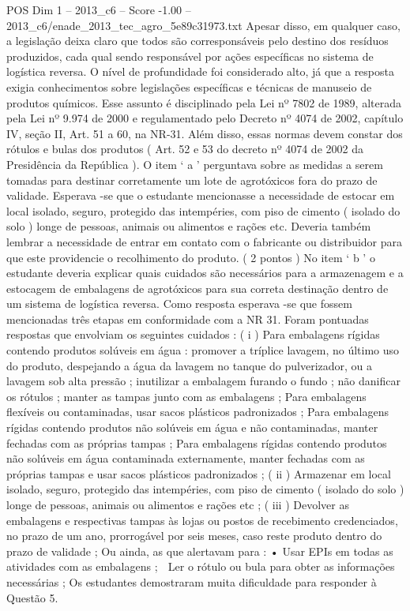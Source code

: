 \begin{textsample}{POS Dim 1 – 2013\_c6 – Score -1.00 – 2013\_c6/enade\_2013\_tec\_agro\_5e89c31973.txt}
Apesar disso, em qualquer caso, a legislação deixa claro que todos são corresponsáveis pelo destino dos resíduos produzidos, cada qual sendo responsável por ações específicas no sistema de logística reversa.
O nível de profundidade foi considerado alto, já que a resposta exigia conhecimentos sobre legislações específicas e técnicas de manuseio de produtos químicos.
Esse assunto é disciplinado pela Lei nº 7802 de 1989, alterada pela Lei nº 9.974 de 2000 e regulamentado pelo Decreto nº 4074 de 2002, capítulo IV, seção II, Art. 51 a 60, na NR-31.
Além disso, essas normas devem constar dos rótulos e bulas dos produtos ( Art. 52 e 53 do decreto nº 4074 de 2002 da Presidência da República ).
O item ‘ a ’ perguntava sobre as medidas a serem tomadas para destinar corretamente um lote de agrotóxicos fora do prazo de validade.
Esperava -se que o estudante mencionasse a necessidade de estocar em local isolado, seguro, protegido das intempéries, com piso de cimento ( isolado do solo ) longe de pessoas, animais ou alimentos e rações etc.
Deveria também lembrar a necessidade de entrar em contato com o fabricante ou distribuidor para que este providencie o recolhimento do produto. ( 2 pontos ) No item ‘ b ’ o estudante deveria explicar quais cuidados são necessários para a armazenagem e a estocagem de embalagens de agrotóxicos para sua correta destinação dentro de um sistema de logística reversa.
Como resposta esperava -se que fossem mencionadas três etapas em conformidade com a NR 31.
Foram pontuadas respostas que envolviam os seguintes cuidados : ( i ) Para embalagens rígidas contendo produtos solúveis em água : promover a tríplice lavagem, no último uso do produto, despejando a água da lavagem no tanque do pulverizador, ou a lavagem sob alta pressão ; inutilizar a embalagem furando o fundo ; não danificar os rótulos ; manter as tampas junto com as embalagens ; Para embalagens flexíveis ou contaminadas, usar sacos plásticos padronizados ; Para embalagens rígidas contendo produtos não solúveis em água e não contaminadas, manter fechadas com as próprias tampas ; Para embalagens rígidas contendo produtos não solúveis em água contaminada externamente, manter fechadas com as próprias tampas e usar sacos plásticos padronizados ; ( ii ) Armazenar em local isolado, seguro, protegido das intempéries, com piso de cimento ( isolado do solo ) longe de pessoas, animais ou alimentos e rações etc ; ( iii ) Devolver as embalagens e respectivas tampas às lojas ou postos de recebimento credenciados, no prazo de um ano, prorrogável por seis meses, caso reste produto dentro do prazo de validade ; Ou ainda, as que alertavam para : • Usar EPIs em todas as atividades com as embalagens ;  Ler o rótulo ou bula para obter as informações necessárias ; Os estudantes demostraram muita dificuldade para responder à Questão 5.

\end{textsample}
